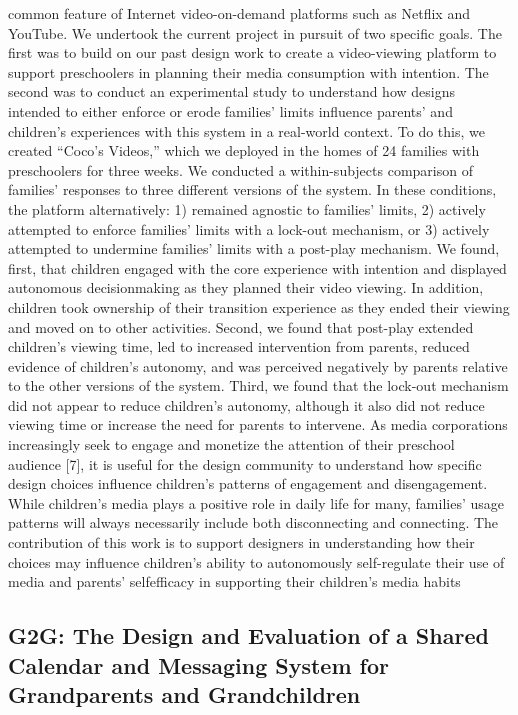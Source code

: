 common feature of Internet video-on-demand platforms such
as Netflix and YouTube.
We undertook the current project in pursuit of two specific
goals. The first was to build on our past design work to
create a video-viewing platform to support preschoolers in
planning their media consumption with intention. The second was to conduct an experimental study to understand how
designs intended to either enforce or erode families’ limits
influence parents’ and children’s experiences with this system in a real-world context. To do this, we created “Coco’s
Videos,” which we deployed in the homes of 24 families with
preschoolers for three weeks. We conducted a within-subjects comparison of families’ responses to three different versions of the system. In these conditions, the platform alternatively: 1) remained agnostic to families’ limits, 2) actively
attempted to enforce families’ limits with a lock-out mechanism, or 3) actively attempted to undermine families’ limits
with a post-play mechanism.
We found, first, that children engaged with the core experience with intention and displayed autonomous decisionmaking as they planned their video viewing. In addition,
children took ownership of their transition experience as they
ended their viewing and moved on to other activities. Second, we found that post-play extended children’s viewing
time, led to increased intervention from parents, reduced evidence of children’s autonomy, and was perceived negatively
by parents relative to the other versions of the system. Third,
we found that the lock-out mechanism did not appear to reduce children’s autonomy, although it also did not reduce
viewing time or increase the need for parents to intervene.
As media corporations increasingly seek to engage and monetize the attention of their preschool audience [7], it is useful
for the design community to understand how specific design
choices influence children’s patterns of engagement and disengagement. While children’s media plays a positive role in
daily life for many, families’ usage patterns will always necessarily include both disconnecting and connecting. The contribution of this work is to support designers in understanding how their choices may influence children’s ability to autonomously self-regulate their use of media and parents’ selfefficacy in supporting their children’s media habits


\subsection{G2G: The Design and Evaluation of a Shared Calendar and
Messaging System for Grandparents and Grandchildren }

